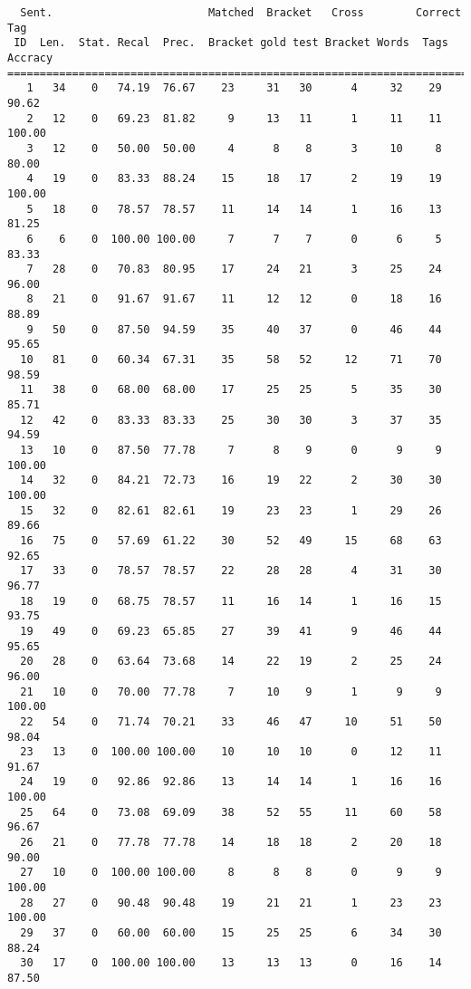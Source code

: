 \scriptsize
\begin{verbatim}
  Sent.                        Matched  Bracket   Cross        Correct Tag
 ID  Len.  Stat. Recal  Prec.  Bracket gold test Bracket Words  Tags Accracy
============================================================================
   1   34    0   74.19  76.67    23     31   30      4     32    29    90.62
   2   12    0   69.23  81.82     9     13   11      1     11    11   100.00
   3   12    0   50.00  50.00     4      8    8      3     10     8    80.00
   4   19    0   83.33  88.24    15     18   17      2     19    19   100.00
   5   18    0   78.57  78.57    11     14   14      1     16    13    81.25
   6    6    0  100.00 100.00     7      7    7      0      6     5    83.33
   7   28    0   70.83  80.95    17     24   21      3     25    24    96.00
   8   21    0   91.67  91.67    11     12   12      0     18    16    88.89
   9   50    0   87.50  94.59    35     40   37      0     46    44    95.65
  10   81    0   60.34  67.31    35     58   52     12     71    70    98.59
  11   38    0   68.00  68.00    17     25   25      5     35    30    85.71
  12   42    0   83.33  83.33    25     30   30      3     37    35    94.59
  13   10    0   87.50  77.78     7      8    9      0      9     9   100.00
  14   32    0   84.21  72.73    16     19   22      2     30    30   100.00
  15   32    0   82.61  82.61    19     23   23      1     29    26    89.66
  16   75    0   57.69  61.22    30     52   49     15     68    63    92.65
  17   33    0   78.57  78.57    22     28   28      4     31    30    96.77
  18   19    0   68.75  78.57    11     16   14      1     16    15    93.75
  19   49    0   69.23  65.85    27     39   41      9     46    44    95.65
  20   28    0   63.64  73.68    14     22   19      2     25    24    96.00
  21   10    0   70.00  77.78     7     10    9      1      9     9   100.00
  22   54    0   71.74  70.21    33     46   47     10     51    50    98.04
  23   13    0  100.00 100.00    10     10   10      0     12    11    91.67
  24   19    0   92.86  92.86    13     14   14      1     16    16   100.00
  25   64    0   73.08  69.09    38     52   55     11     60    58    96.67
  26   21    0   77.78  77.78    14     18   18      2     20    18    90.00
  27   10    0  100.00 100.00     8      8    8      0      9     9   100.00
  28   27    0   90.48  90.48    19     21   21      1     23    23   100.00
  29   37    0   60.00  60.00    15     25   25      6     34    30    88.24
  30   17    0  100.00 100.00    13     13   13      0     16    14    87.50

\end{verbatim}

